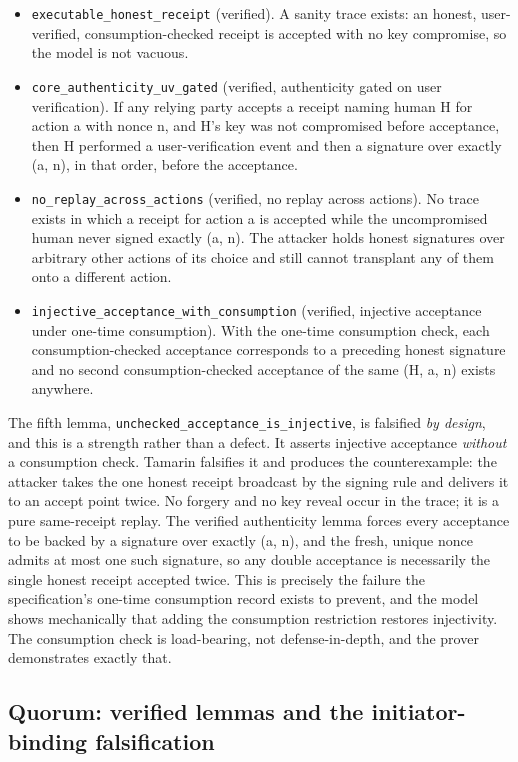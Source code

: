 \documentclass[11pt]{article}
\newcommand{\code}[1]{\texttt{#1}}
\begin{document}
\begin{itemize}[leftmargin=*]
\item \code{executable\_honest\_receipt} (verified). A sanity trace exists: an
honest, user-verified, consumption-checked receipt is accepted with no key
compromise, so the model is not vacuous.
\item \code{core\_authenticity\_uv\_gated} (verified, authenticity gated on user
verification). If any relying party accepts a receipt naming human H for action a
with nonce n, and H's key was not compromised before acceptance, then H performed a
user-verification event and then a signature over exactly (a, n), in that order,
before the acceptance.
\item \code{no\_replay\_across\_actions} (verified, no replay across actions). No
trace exists in which a receipt for action a is accepted while the uncompromised
human never signed exactly (a, n). The attacker holds honest signatures over
arbitrary other actions of its choice and still cannot transplant any of them onto
a different action.
\item \code{injective\_acceptance\_with\_consumption} (verified, injective
acceptance under one-time consumption). With the one-time consumption check, each
consumption-checked acceptance corresponds to a preceding honest signature and no
second consumption-checked acceptance of the same (H, a, n) exists anywhere.
\end{itemize}

The fifth lemma, \code{unchecked\_acceptance\_is\_injective}, is falsified \emph{by
design}, and this is a strength rather than a defect. It asserts injective
acceptance \emph{without} a consumption check. Tamarin falsifies it and produces
the counterexample: the attacker takes the one honest receipt broadcast by the
signing rule and delivers it to an accept point twice. No forgery and no key reveal
occur in the trace; it is a pure same-receipt replay. The verified authenticity
lemma forces every acceptance to be backed by a signature over exactly (a, n), and
the fresh, unique nonce admits at most one such signature, so any double acceptance
is necessarily the single honest receipt accepted twice. This is precisely the
failure the specification's one-time consumption record exists to prevent, and the
model shows mechanically that adding the consumption restriction restores
injectivity. The consumption check is load-bearing, not defense-in-depth, and the
prover demonstrates exactly that.

\subsection{Quorum: verified lemmas and the initiator-binding falsification}
\end{document}
